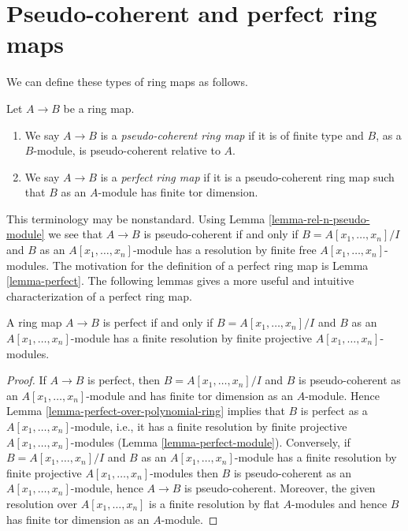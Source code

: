 \section{Pseudo-coherent and perfect ring maps}
\label{section-pseudo-coherent-perfect-ring-map}

\noindent
We can define these types of ring maps as follows.

\begin{definition}
\label{definition-pseudo-coherent-perfect}
Let $A \to B$ be a ring map.
\begin{enumerate}
\item We say $A \to B$ is a {\it pseudo-coherent ring map} if it is of finite
type and $B$, as a $B$-module, is pseudo-coherent relative to $A$.
\item We say $A \to B$ is a {\it perfect ring map} if it is a
pseudo-coherent ring map such that $B$ as an $A$-module has finite
tor dimension.
\end{enumerate}
\end{definition}

\noindent
This terminology may be nonstandard. Using
Lemma \ref{lemma-rel-n-pseudo-module}
we see that $A \to B$ is pseudo-coherent if and only if
$B = A[x_1, \ldots, x_n]/I$ and $B$ as an $A[x_1, \ldots, x_n]$-module
has a resolution by finite free $A[x_1, \ldots, x_n]$-modules.
The motivation for the definition of a perfect ring map is
Lemma \ref{lemma-perfect}.
The following lemmas gives a more useful and intuitive
characterization of a perfect ring map.

\begin{lemma}
\label{lemma-perfect-ring-map}
A ring map $A \to B$ is perfect if and only if $B = A[x_1, \ldots, x_n]/I$
and $B$ as an $A[x_1, \ldots, x_n]$-module has a finite resolution by
finite projective $A[x_1, \ldots, x_n]$-modules.
\end{lemma}

\begin{proof}
If $A \to B$ is perfect, then $B = A[x_1, \ldots, x_n]/I$ and
$B$ is pseudo-coherent as an $A[x_1, \ldots, x_n]$-module and
has finite tor dimension as an $A$-module. Hence
Lemma \ref{lemma-perfect-over-polynomial-ring}
implies that $B$ is perfect as a $A[x_1, \ldots, x_n]$-module, i.e.,
it has a finite resolution by finite projective $A[x_1, \ldots, x_n]$-modules
(Lemma \ref{lemma-perfect-module}).
Conversely, if $B = A[x_1, \ldots, x_n]/I$
and $B$ as an $A[x_1, \ldots, x_n]$-module has a finite resolution by
finite projective $A[x_1, \ldots, x_n]$-modules then
$B$ is pseudo-coherent as an $A[x_1, \ldots, x_n]$-module,
hence $A \to B$ is pseudo-coherent. Moreover, the given resolution
over $A[x_1, \ldots, x_n]$ is a finite resolution by flat
$A$-modules and hence $B$ has finite tor dimension as an $A$-module.
\end{proof}

